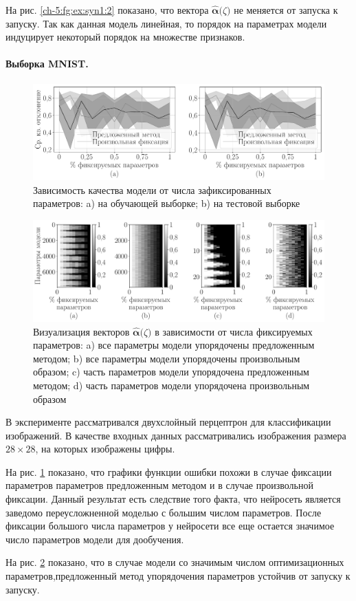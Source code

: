 На рис. \ref{ch-5:fg:ex:syn1:2} показано, что вектора $\hat{\bm{\alpha}}\bigr(\zeta\bigr)$ не меняется от запуска к запуску. Так как данная модель линейная, то порядок на параметрах модели индуцирует некоторый порядок на множестве признаков.

\paragraph{Выборка MNIST.}

\begin{figure}[h!t]\center
\includegraphics[width=1\textwidth]{results/order/mnist_data_loss}
\caption{Зависимость качества модели от числа зафиксированных параметров: a) на обучающей выборке; b) на тестовой выборке}
\label{ch-5:fg:ex:mnist:1}
\end{figure}

\begin{figure}[h!t]\center
\includegraphics[width=1\textwidth]{results/order/mnist_data_matshow}
\caption{Визуализация векторов $\hat{\bm{\alpha}}\bigr(\zeta\bigr)$ в зависимости от числа фиксируемых параметров: a) все параметры модели упорядочены предложенным методом; b) все параметры модели упорядочены произвольным образом; c) часть параметров модели упорядочена предложенным методом; d) часть параметров модели упорядочена произвольным образом}
\label{ch-5:fg:ex:mnist:2}
\end{figure}

В эксперименте рассматривался двухслойный перцептрон для классификации изображений. В качестве входных данных рассматривались изображения размера $28\times28$, на которых изображены цифры. 

На рис. \ref{ch-5:fg:ex:mnist:1} показано, что графики функции ошибки похожи в случае фиксации параметров параметров предложенным методом и в случае произвольной фиксации. Данный результат есть следствие того факта, что нейросеть является заведомо переусложненной моделью с большим числом параметров. После фиксации большого числа параметров у нейросети все еще остается значимое число параметров модели для дообучения.

На рис. \ref{ch-5:fg:ex:mnist:2} показано, что в случае модели со значимым числом оптимизационных параметров,предложенный метод упорядочения параметров устойчив от запуску к запуску.

